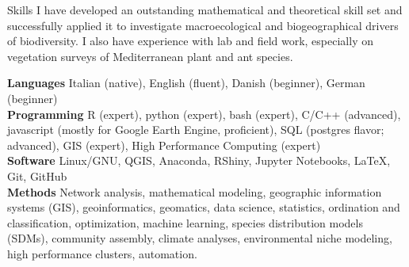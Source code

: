 \documentclass{resume} %
\begin{document}
\begin{rSection}{Skills}
I have developed an outstanding mathematical and theoretical skill set and successfully applied it to investigate macroecological and biogeographical drivers of biodiversity.
I also have experience with lab and field work, especially on vegetation surveys of Mediterranean plant and ant species.

{\bf Languages} Italian (native), English (fluent), Danish (beginner), German (beginner)\\
{\bf Programming} R (expert), python (expert), bash (expert), C/C++ (advanced), javascript (mostly for Google Earth Engine, proficient), SQL (postgres flavor; advanced), GIS (expert), High Performance Computing (expert)\\
{\bf Software} Linux/GNU, QGIS, Anaconda, RShiny, Jupyter Notebooks, \LaTeX, Git, GitHub\\
{\bf Methods} 
Network analysis,
mathematical modeling,
geographic information systems (GIS),
geoinformatics,
geomatics,
data science,
statistics,
ordination and classification,
optimization,
machine learning,
species distribution models (SDMs),
community assembly,
climate analyses,
environmental niche modeling,
high performance clusters, 
automation.
\end{rSection}
\end{document}

